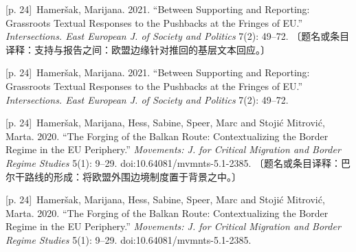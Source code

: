 \documentclass[10pt,a4paper]{article}
\begin{document}
\noindent\begin{minipage}{\textwidth}\begin{minipage}[t]{\dimexpr.5\textwidth-4mm\relax}{\scriptsize\color{gray} [p. 24]}\ Hameršak, Marijana. 2021. “Between Supporting and Reporting: Grassroots Textual Responses to the Pushbacks at the Fringes of EU.” \textit{Intersections. East European J. of Society and Politics} 7(2): 49–72. 〔题名或条目译释：支持与报告之间：欧盟边缘针对推回的基层文本回应。〕\par\end{minipage}\hfill\begin{minipage}[t]{\dimexpr.5\textwidth-4mm\relax}{\scriptsize\color{gray} [p. 24]}\ Hameršak, Marijana. 2021. “Between Supporting and Reporting: Grassroots Textual Responses to the Pushbacks at the Fringes of EU.” \textit{Intersections. East European J. of Society and Politics} 7(2): 49–72.\par\end{minipage}\end{minipage}\par
\noindent\begin{minipage}{\textwidth}\begin{minipage}[t]{\dimexpr.5\textwidth-4mm\relax}{\scriptsize\color{gray} [p. 24]}\ Hameršak, Marijana, Hess, Sabine, Speer, Marc and Stojić Mitrović, Marta. 2020. “The Forging of the Balkan Route: Contextualizing the Border Regime in the EU Periphery.” \textit{Movements: J. for Critical Migration and Border Regime Studies} 5(1): 9–29. doi:10.64081/mvmnts-5.1-2385. 〔题名或条目译释：巴尔干路线的形成：将欧盟外围边境制度置于背景之中。〕\par\end{minipage}\hfill\begin{minipage}[t]{\dimexpr.5\textwidth-4mm\relax}{\scriptsize\color{gray} [p. 24]}\ Hameršak, Marijana, Hess, Sabine, Speer, Marc and Stojić Mitrović, Marta. 2020. “The Forging of the Balkan Route: Contextualizing the Border Regime in the EU Periphery.” \textit{Movements: J. for Critical Migration and Border Regime Studies} 5(1): 9–29. doi:10.64081/mvmnts-5.1-2385.\par\end{minipage}\end{minipage}\par
\end{document}
